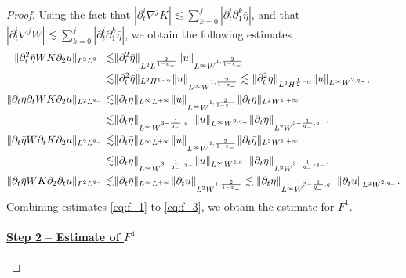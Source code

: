 \documentclass[letterpaper,reqno,10pt,twoside]{amsart}
\theoremstyle{definition}
\theoremstyle{remark}
\def\p{\partial}
\begin{document}
\begin{proof}
		\noindent Using the fact that $|\partial_{t}^{i}\nabla^{j}K|\lesssim \sum_{k=0}^{j}|\partial_{t}^{i}\partial_{1}^{k}\bar{\eta}|$, and that $|\p_{t}^{i}\nabla^{j}W|\lesssim \sum_{k=0}^{j}|\partial_{t}^{i}\partial_{1}^{k}\bar{\eta}|$, we obtain the following estimates 
		\begin{align}{\label{eq:f_3}}
			\begin{aligned}
				\|\partial_{t}^{2}\bar{\eta}WK\partial_{2}u\|_{L^{2}L^{q_{-}}}\lesssim &\|\p_{t}^{2}\bar{\eta}\|_{L^{2}L^{\frac{2}{1-\varepsilon_{-}}}}\|u\|_{L^{\infty}W^{1,\frac{2}{1-\varepsilon_{-}}}}\\
				\lesssim& \|\p_{t}^{2}\bar{\eta}\|_{L^{2}H^{1-\alpha}}\|u\|_{L^{\infty}W^{1,\frac{2}{1-\varepsilon_{-}}}}\lesssim \|\p_{t}^{2}{\eta}\|_{L^{2}H^{\frac{1}{2}-\alpha}}\|u\|_{L^{\infty}W^{2,q_{-}}},\\
				\|\partial_{t}\bar{\eta}\p_{t}WK\partial_{2}u\|_{L^{2}L^{q_{-}}}\lesssim &\|\p_{t}\bar{\eta}\|_{L^{\infty}L^{+\infty}}\|u\|_{L^{\infty}W^{1,\frac{2}{1-\varepsilon_{-}}}}\|\partial_{t}\bar{\eta}\|_{L^{2}W^{1,+\infty}}\\\lesssim& \|\p_{t}{\eta}\|_{L^{\infty}W^{3-\frac{1}{q_{-}},q_{-}}}\|u\|_{L^{\infty}W^{2,q_{-}}}\|\partial_{t}{\eta}\|_{L^{2}W^{3-\frac{1}{q_{-}},q_{-}}},\\
				\|\partial_{t}\bar{\eta}W\p_{t}K\partial_{2}u\|_{L^{2}L^{q_{-}}}\lesssim &\|\p_{t}\bar{\eta}\|_{L^{\infty}L^{+\infty}}\|u\|_{L^{\infty}W^{1,\frac{2}{1-\varepsilon_{-}}}}\|\partial_{t}\bar{\eta}\|_{L^{2}W^{1,+\infty}}\\\lesssim& \|\p_{t}{\eta}\|_{L^{\infty}W^{3-\frac{1}{q_{-}},q_{-}}}\|u\|_{L^{\infty}W^{2,q_{-}}}\|\partial_{t}{\eta}\|_{L^{2}W^{3-\frac{1}{q_{-}},q_{-}}},\\
				\|\partial_{t}\bar{\eta}WK\partial_{2}\p_{t}u\|_{L^{2}L^{q_{-}}}\lesssim &\|\p_{t}\bar{\eta}\|_{L^{\infty}L^{+\infty}}\|\p_{t}u\|_{L^{2}W^{1,\frac{2}{1-\varepsilon_{-}}}}\lesssim \|\p_{t}{\eta}\|_{L^{\infty}W^{3-\frac{1}{q_{-}},q_{-}}}\|\p_{t}u\|_{L^{2}W^{2,q_{-}}}.
			\end{aligned}
		\end{align}
		\noindent Combining estimates \eqref{eq:f_1} to \eqref{eq:f_3}, we obtain the estimate for $F^{1}$.
	
	\paragraph{\underline{Step 2 -- Estimate of $F^{4}$}}
	

\end{proof}
\end{document}
